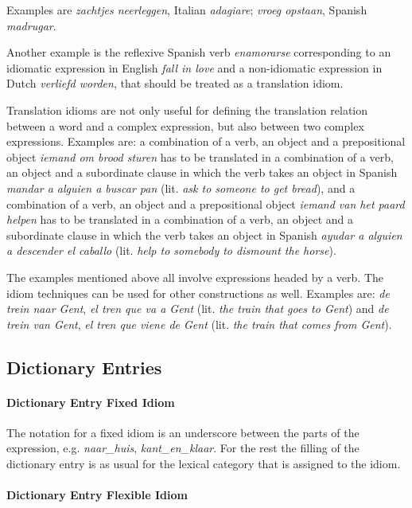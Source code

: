 Examples are {\em zachtjes neerleggen}, Italian {\em adagiare};
{\em vroeg opstaan}, Spanish {\em madrugar}.

Another example is the reflexive Spanish verb {\em enamorarse} corresponding to
an idiomatic expression in English {\em fall in love} and a non-idiomatic
expression in Dutch {\em verliefd worden}, that should be treated as a
translation idiom. 

Translation idioms are not only useful for defining the translation relation
between a word and a complex expression, but also between two complex
expressions. Examples are: a combination of a verb, an object and a
prepositional object {\em iemand om brood sturen} has to be translated in a
combination of a verb, an object and a subordinate clause in which the verb
takes an object in Spanish {\em mandar a alguien a buscar pan} (lit. {\em ask
to someone to get bread}), and a combination of a verb, an object and a
prepositional object {\em iemand van het paard helpen} has to be translated in
a combination of a verb, an object and a subordinate clause in which the verb
takes an object in Spanish {\em ayudar a alguien a descender el caballo} (lit.
{\em help to somebody to dismount the horse}). 

The examples mentioned above all involve expressions headed by a verb. The
idiom techniques can be used for other constructions as well. Examples are:
{\em de trein naar Gent}, {\em el tren que va a Gent} (lit. {\em the train that
goes to Gent}) and {\em de trein van Gent}, {\em el tren que viene de Gent}
(lit. {\em the train that comes from Gent}). 

\subsection{Dictionary Entries}

\paragraph{Dictionary Entry Fixed Idiom}

The notation for a fixed idiom is an underscore between the parts 
of the expression, e.g. {\em naar\_huis}, {\em kant\_en\_klaar}. For the rest
the filling of the dictionary entry is as usual for the lexical category that is
assigned to the idiom. 


\paragraph{Dictionary Entry Flexible Idiom}

